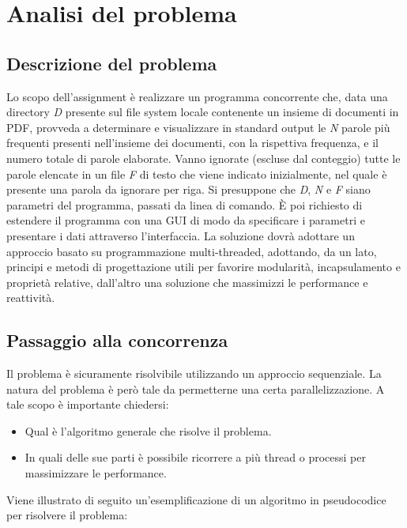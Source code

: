\chapter{Analisi del problema}
\section{Descrizione del problema}
Lo scopo dell'assignment è realizzare un programma concorrente che, data una directory \textit{D} presente sul file system locale contenente un insieme di documenti in PDF, provveda a determinare e visualizzare in standard output le \textit{N} parole più frequenti presenti nell’insieme dei documenti, con la rispettiva frequenza, e il numero totale di parole elaborate.\newline
Vanno ignorate (escluse dal conteggio) tutte le parole elencate in un file \textit{F} di testo che viene indicato inizialmente, nel quale è presente una parola da ignorare per riga.\newline
Si presuppone che \textit{D}, \textit{N} e \textit{F} siano parametri del programma, passati da linea di comando. È poi richiesto di estendere il programma con una GUI di modo da specificare i parametri e presentare i dati attraverso l'interfaccia.
\newline \newline
La soluzione dovrà adottare un approccio basato su programmazione multi-threaded, adottando, da un lato, principi e metodi di progettazione utili per favorire modularità, incapsulamento e
proprietà relative, dall’altro una soluzione che massimizzi le performance e reattività.

\section{Passaggio alla concorrenza}
Il problema è sicuramente risolvibile utilizzando un approccio sequenziale. La natura del problema è però tale da permetterne una certa parallelizzazione. A tale scopo è importante chiedersi:
\begin{itemize}
    \item Qual è l'algoritmo generale che risolve il problema.
    \item In quali delle sue parti è possibile ricorrere a più thread o processi per massimizzare le performance.
\end{itemize}

\noindent Viene illustrato di seguito un'esemplificazione di un algoritmo in pseudocodice per risolvere il problema:

